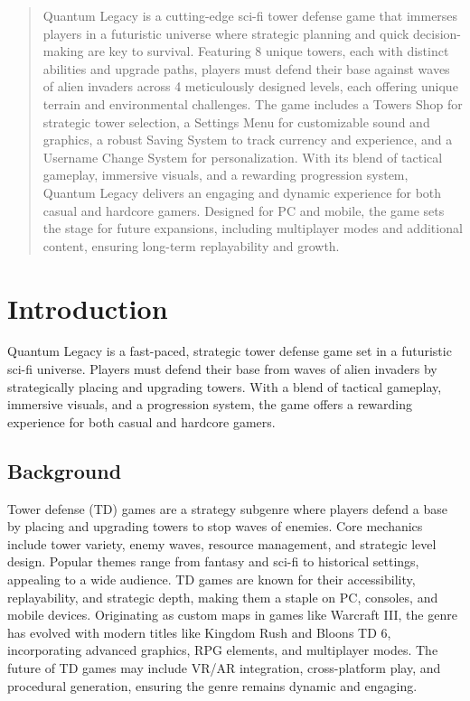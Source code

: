 \documentclass[12pt,a4paper]{report}
\begin{document}


\tableofcontents
\newpage


\begin{abstract}
Quantum Legacy is a cutting-edge sci-fi tower defense game that immerses players in a futuristic universe where strategic planning and quick decision-making are key to survival. Featuring 8 unique towers, each with distinct abilities and upgrade paths, players must defend their base against waves of alien invaders across 4 meticulously designed levels, each offering unique terrain and environmental challenges. The game includes a Towers Shop for strategic tower selection, a Settings Menu for customizable sound and graphics, a robust Saving System to track currency and experience, and a Username Change System for personalization. With its blend of tactical gameplay, immersive visuals, and a rewarding progression system, Quantum Legacy delivers an engaging and dynamic experience for both casual and hardcore gamers. Designed for PC and mobile, the game sets the stage for future expansions, including multiplayer modes and additional content, ensuring long-term replayability and growth.
\end{abstract}


\chapter{Introduction}
Quantum Legacy is a fast-paced, strategic tower defense game set in a futuristic sci-fi universe. Players must defend their base from waves of alien invaders by strategically placing and upgrading towers. With a blend of tactical gameplay, immersive visuals, and a progression system, the game offers a rewarding experience for both casual and hardcore gamers.  

\section{Background}
Tower defense (TD) games are a strategy subgenre where players defend a base by placing and upgrading towers to stop waves of enemies. Core mechanics include tower variety, enemy waves, resource management, and strategic level design. Popular themes range from fantasy and sci-fi to historical settings, appealing to a wide audience. TD games are known for their accessibility, replayability, and strategic depth, making them a staple on PC, consoles, and mobile devices. Originating as custom maps in games like Warcraft III, the genre has evolved with modern titles like Kingdom Rush and Bloons TD 6, incorporating advanced graphics, RPG elements, and multiplayer modes. The future of TD games may include VR/AR integration, cross-platform play, and procedural generation, ensuring the genre remains dynamic and engaging.
\end{document}
